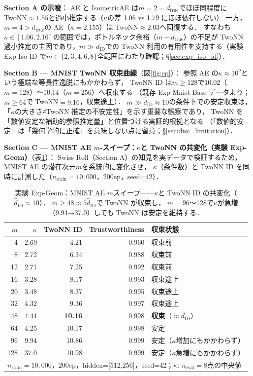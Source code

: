 \documentclass[11pt,a4paper]{jsarticle}
\newcommand{\kap}{\kappa}
\begin{document}
\textbf{Section A の示唆}：
AE と IsometricAE は$m=2=d_\mathrm{true}$でほぼ同程度に TwoNN$\approx1.55$と過小推定する（$\kap$の差 1.06 vs 1.79 にほぼ依存しない）
一方，$m=4>d_\mathrm{true}$の AE（$\kap=2.155$）は TwoNN$\approx2.03$へ回復する．
すなわち$\kap \in [1.06, 2.16]$の範囲では，ボトルネック余裕（$m - d_\mathrm{true}$）の不足が
TwoNN 過小推定の主因であり，$m \gg d_\mathrm{ID}$での TwoNN 利用の有用性を支持する（実験 Exp-Iso-ID で$m \in \{2,3,4,6,8\}$全範囲にわたり確認；§\ref{sec:exp_iso_id}）．

\textbf{Section B — MNIST TwoNN 収束曲線}（図\ref{fig:ep}）：
参照 AE の$\kap \approx 10^9$という極端な等長性逸脱にもかかわらず，
TwoNN ID は$m \geq 128$で$10.02$（$m=128$）〜$10.14$（$m=256$）へ収束する
（既存 Exp-Mnist-Base データより；$m \geq 64$で TwoNN$=9.16$，収束途上）．
$m \gg \hat{d}_\mathrm{ID} \approx 10$の条件下での安定収束は，
「$\kap$の大きさ≠TwoNN 推定の不安定性」を示す重要な観察であり，
TwoNN を「数値安定な補助的参照推定量」と位置づける実証的根拠となる
（「数値的安定」は「幾何学的に正確」を意味しない点に留意；§\ref{sec:disc_limitation}）．

\textbf{Section C — MNIST AE $m$-スイープ：$\kappa$と TwoNN の共変化（実験 Exp-Geom）}（表\ref{tab:eq_mnist}）：
Swiss Roll（Section A）の知見を実データで検証するため，MNIST AE の潜在次元$m$を系統的に変化させ，
$\kap$（条件数）と TwoNN ID を同時に計測した（$n_\mathrm{train}=10{,}000$，200ep，seed=42）．

\begin{table}[H]
\centering
\caption{実験 Exp-Geom：MNIST AE $m$スイープ——$\kap$と TwoNN ID の共変化（$\hat{d}_\mathrm{ID}\approx10$）．
$m \geq 48 \approx 5\hat{d}_\mathrm{ID}$で TwoNN が収束し，
$m=96$〜128で$\kap$が急増（9.94→37.0）しても TwoNN は安定を維持する．}
\label{tab:eq_mnist}
\small
\begin{tabular}{rrrrl}
\toprule
$m$ & $\kap$ & TwoNN ID & Trustworthiness & 収束状態 \\
\midrule
 4  & 2.69 & 4.21 & 0.960 & 収束前 \\
 8  & 2.72 & 6.34 & 0.988 & 収束前 \\
12  & 2.71 & 7.25 & 0.992 & 収束前 \\
16  & 3.28 & 8.17 & 0.993 & 収束途上 \\
20  & 3.48 & 8.37 & 0.995 & 収束途上 \\
32  & 4.32 & 9.36 & 0.997 & 収束途上 \\
48  & 4.44 & \textbf{10.16} & 0.998 & \textbf{収束}（$\approx\hat{d}_\mathrm{ID}$） \\
64  & 4.25 & 10.17 & 0.998 & 安定 \\
96  & 9.94 & 10.86 & 0.999 & 安定（$\kap$増加にもかかわらず） \\
128 & 37.0 & 10.98 & 0.999 & 安定（$\kap$急増にもかかわらず） \\
\midrule
\multicolumn{5}{l}{$n_\mathrm{train}=10{,}000$，200ep，hidden=[512,256]，seed=42；$\kap$: $n_\mathrm{eval}=8$点の中央値} \\
\bottomrule
\end{tabular}
\end{table}
\end{document}
